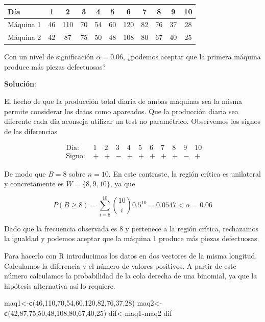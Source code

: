 \documentclass[
]{article}
\newenvironment{Shaded}{\begin{snugshade}}{\end{snugshade}}
\newcommand{\DecValTok}[1]{\textcolor[rgb]{0.00,0.00,0.81}{#1}}
\newcommand{\FunctionTok}[1]{\textcolor[rgb]{0.13,0.29,0.53}{\textbf{#1}}}
\newcommand{\NormalTok}[1]{#1}
\newcommand{\OtherTok}[1]{\textcolor[rgb]{0.56,0.35,0.01}{#1}}
\newcommand{\SpecialCharTok}[1]{\textcolor[rgb]{0.81,0.36,0.00}{\textbf{#1}}}
\begin{document}
\begin{longtable}[]{@{}lcccccccccc@{}}
\toprule\noalign{}
Día & 1 & 2 & 3 & 4 & 5 & 6 & 7 & 8 & 9 & 10 \\
\midrule\noalign{}
\endhead
\bottomrule\noalign{}
\endlastfoot
Máquina 1 & 46 & 110 & 70 & 54 & 60 & 120 & 82 & 76 & 37 & 28 \\
Máquina 2 & 42 & 87 & 75 & 50 & 48 & 108 & 80 & 67 & 40 & 25 \\
\end{longtable}

Con un nivel de significación \(\alpha=0.06\), ¿podemos aceptar que la primera máquina produce más piezas defectuosas?

\textbf{Solución}:

El hecho de que la producción total diaria de ambas máquinas sea la misma permite considerar los datos como apareados. Que la producción diaria sea diferente cada día aconseja utilizar un test no paramétrico.
Observemos los signos de las diferencias

\[
\begin{array}{lcccccccccc}
\text { Día: } & 1 & 2 & 3 & 4 & 5 & 6 & 7 & 8 & 9 & 10 \\
\text { Signo: } & + & + & - & + & + & + & + & + & - & +
\end{array}
\]

De modo que \(B=8\) sobre \(n=10\). En este contraste, la región crítica es unilateral y concretamente es \(W=\{8,9,10\}\), ya que

\[
P(B \geq 8)=\sum_{i=8}^{10}\binom{10}{i} 0.5^{10}=0.0547<\alpha=0.06
\]

Dado que la frecuencia observada es 8 y pertenece a la región crítica, rechazamos la igualdad y podemos aceptar que la máquina 1 produce más piezas defectuosas.

Para hacerlo con R introducimos los datos en dos vectores de la misma longitud. Calculamos la diferencia y el número de valores positivos. A partir de este número calculamos la probabilidad de la cola derecha de una binomial, ya que la hipótesis alternativa así lo requiere.

\begin{Shaded}
\begin{Highlighting}[]
\NormalTok{maq1}\OtherTok{\textless{}{-}}\FunctionTok{c}\NormalTok{(}\DecValTok{46}\NormalTok{,}\DecValTok{110}\NormalTok{,}\DecValTok{70}\NormalTok{,}\DecValTok{54}\NormalTok{,}\DecValTok{60}\NormalTok{,}\DecValTok{120}\NormalTok{,}\DecValTok{82}\NormalTok{,}\DecValTok{76}\NormalTok{,}\DecValTok{37}\NormalTok{,}\DecValTok{28}\NormalTok{)}
\NormalTok{maq2}\OtherTok{\textless{}{-}}\FunctionTok{c}\NormalTok{(}\DecValTok{42}\NormalTok{,}\DecValTok{87}\NormalTok{,}\DecValTok{75}\NormalTok{,}\DecValTok{50}\NormalTok{,}\DecValTok{48}\NormalTok{,}\DecValTok{108}\NormalTok{,}\DecValTok{80}\NormalTok{,}\DecValTok{67}\NormalTok{,}\DecValTok{40}\NormalTok{,}\DecValTok{25}\NormalTok{)}
\NormalTok{dif}\OtherTok{\textless{}{-}}\NormalTok{maq1}\SpecialCharTok{{-}}\NormalTok{maq2}
\NormalTok{dif}
\end{Highlighting}
\end{Shaded}
\end{document}
